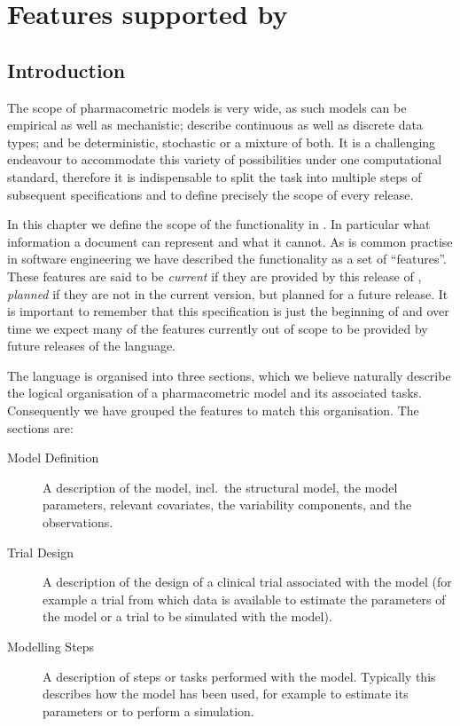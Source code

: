 \newenvironment{features}{%
\firmlists\begin{description}}%
{\end{description}}
\newcommand\feat[1]{\item[-- \normalfont\itshape #1]}


\chapter{Features supported by \pharmml}
\label{chap:scope}


\section{Introduction}

The scope of pharmacometric models is very wide, as such models can be empirical as well as
mechanistic; describe continuous as well as discrete data types; and be deterministic, stochastic
or a mixture of both. It is a challenging endeavour to accommodate this variety of possibilities
under one computational standard, therefore it is indispensable to split the task into multiple
steps of subsequent specifications and to define precisely the scope of every release.

In this chapter we define the scope of the functionality in
\pharmml. In particular what information a \pharmml document can
represent and what it cannot. As is common practise in software
engineering we have described the functionality as a set of
``features''. These features are said to be \emph{current} if they are
provided by this release of \pharmml, \emph{planned} if they are not
in the current version, but planned for a future release.
It is important to remember that this
specification is just the beginning of \pharmml and over time we
expect many of the features currently out of scope to be provided by
future releases of the language.

The language is organised into three sections, which we believe naturally
describe the logical organisation of a pharmacometric model and its
associated tasks. Consequently we have grouped the features to match this
organisation. The sections are:
\begin{description}
\item[Model Definition] A description of the model, incl.\ the structural model, the model
  parameters, relevant covariates, the variability components, and the observations.
\item[Trial Design] A description of the design of a clinical trial associated with the model
  (for example a trial from which data is available to estimate the parameters of the model or
  a trial to be simulated with the model).
\item[Modelling Steps] A description of steps or tasks performed with
  the model. Typically this describes how the model has been used, for
  example to estimate its parameters or to perform a simulation.
\end{description}


